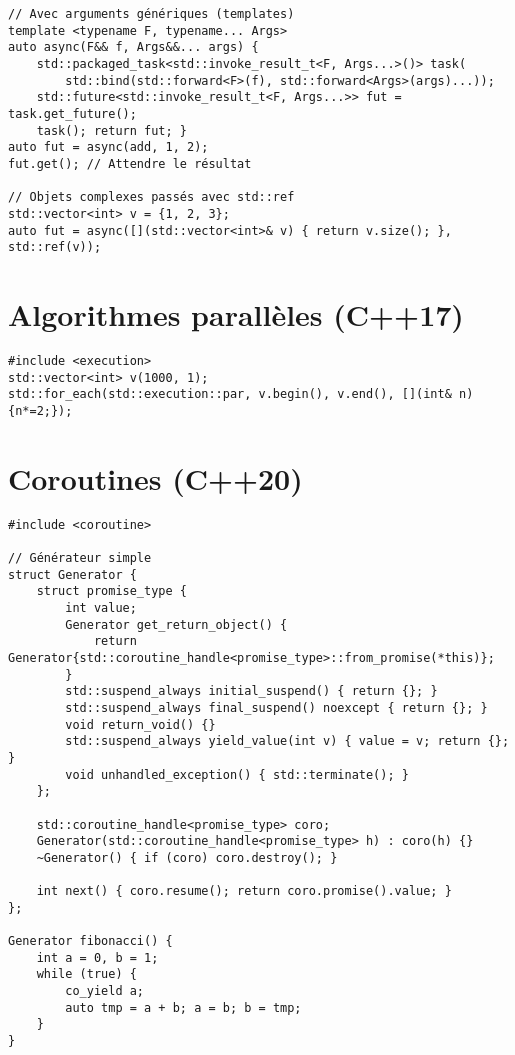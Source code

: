 \documentclass{article}
\begin{document}
\begin{multicols*}{3}
\begin{lstlisting}
// Avec arguments génériques (templates)
template <typename F, typename... Args>
auto async(F&& f, Args&&... args) {
    std::packaged_task<std::invoke_result_t<F, Args...>()> task(
        std::bind(std::forward<F>(f), std::forward<Args>(args)...));
    std::future<std::invoke_result_t<F, Args...>> fut = task.get_future();
    task(); return fut; }
auto fut = async(add, 1, 2);
fut.get(); // Attendre le résultat

// Objets complexes passés avec std::ref
std::vector<int> v = {1, 2, 3};
auto fut = async([](std::vector<int>& v) { return v.size(); }, std::ref(v));
\end{lstlisting}

\section*{Algorithmes parallèles (C++17)}

\begin{lstlisting}
#include <execution>
std::vector<int> v(1000, 1);
std::for_each(std::execution::par, v.begin(), v.end(), [](int& n){n*=2;});
\end{lstlisting}

\section*{Coroutines (C++20)}

\begin{lstlisting}
#include <coroutine>

// Générateur simple
struct Generator {
    struct promise_type {
        int value;
        Generator get_return_object() { 
            return Generator{std::coroutine_handle<promise_type>::from_promise(*this)}; 
        }
        std::suspend_always initial_suspend() { return {}; }
        std::suspend_always final_suspend() noexcept { return {}; }
        void return_void() {}
        std::suspend_always yield_value(int v) { value = v; return {}; }
        void unhandled_exception() { std::terminate(); }
    };
    
    std::coroutine_handle<promise_type> coro;
    Generator(std::coroutine_handle<promise_type> h) : coro(h) {}
    ~Generator() { if (coro) coro.destroy(); }
    
    int next() { coro.resume(); return coro.promise().value; }
};

Generator fibonacci() {
    int a = 0, b = 1;
    while (true) {
        co_yield a;
        auto tmp = a + b; a = b; b = tmp;
    }
}
\end{lstlisting}


\end{multicols*}
\end{document}
